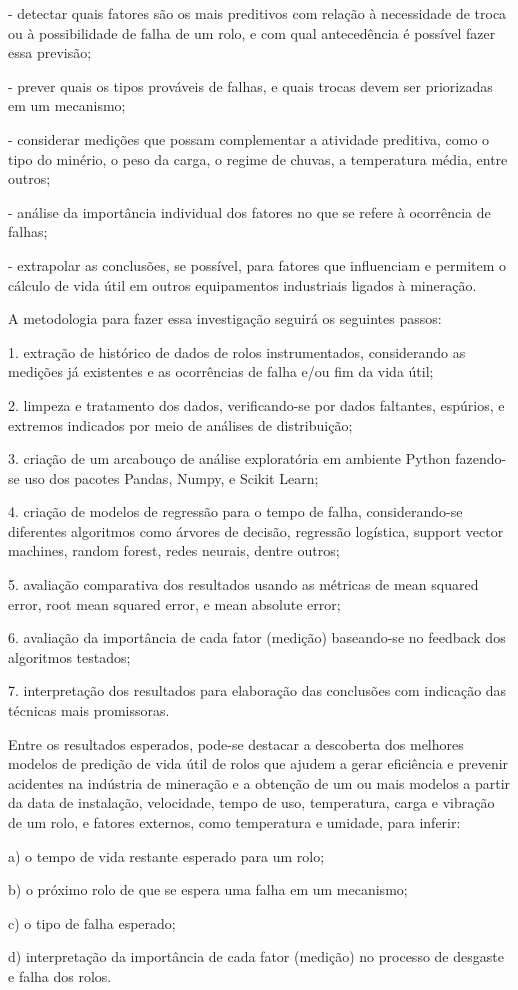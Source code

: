 - detectar quais fatores são os mais preditivos com relação à necessidade de troca ou à possibilidade de falha de um rolo, e com qual antecedência é possível fazer essa previsão;\par
- prever quais os tipos prováveis de falhas, e quais trocas devem ser priorizadas em um mecanismo;\par
- considerar medições que possam complementar a atividade preditiva, como o tipo do minério, o peso da carga, o regime de chuvas, a temperatura média, entre outros;\par
- análise da importância individual dos fatores no que se refere à ocorrência de falhas;\par
- extrapolar as conclusões, se possível, para fatores que influenciam e permitem o cálculo de vida útil em outros equipamentos industriais ligados à mineração.\par
\par
A metodologia para fazer essa investigação seguirá os seguintes passos:\par

1. extração de histórico de dados de rolos instrumentados, considerando as medições já existentes e as ocorrências de falha e/ou fim da vida útil;\par
2. limpeza e tratamento dos dados, verificando-se por dados faltantes, espúrios, e extremos indicados por meio de análises de distribuição;\par
3. criação de um arcabouço de análise exploratória em ambiente Python fazendo-se uso dos pacotes Pandas, Numpy, e Scikit Learn;\par
4. criação de modelos de regressão para o tempo de falha, considerando-se diferentes algoritmos como árvores de decisão, regressão logística, support vector machines, random forest, redes neurais, dentre outros;\par
5. avaliação comparativa dos resultados usando as métricas de mean squared error, root mean squared error, e mean absolute error;\par
6. avaliação da importância de cada fator (medição) baseando-se no feedback dos algoritmos testados;\par
7. interpretação dos resultados para elaboração das conclusões com indicação das técnicas mais promissoras.\par
\par
Entre os resultados esperados, pode-se destacar a descoberta dos melhores modelos de predição de vida útil de rolos que ajudem a gerar eficiência e prevenir acidentes na indústria de mineração e a
obtenção de um ou mais modelos a partir da data de instalação, velocidade, tempo de uso, temperatura, carga e vibração de um rolo, e fatores externos, como temperatura e umidade, para inferir:\par
a) o tempo de vida restante esperado para um rolo;\par
b) o próximo rolo de que se espera uma falha em um mecanismo;\par
c) o tipo de falha esperado;\par
d) interpretação da importância de cada fator (medição) no processo de desgaste e falha dos rolos.\par
